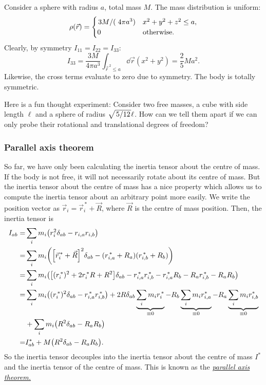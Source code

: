 \documentclass{article}
\begin{document}
\begin{example}[Sphere]
	Consider a sphere with radius $ a $, total mass $ M $. The mass distribution is uniform:
	\[
		\rho(\vec{r}) = \begin{cases}
		\flatfrac{3M}(4 \pi a^{3}) & x^{2} + y^{2} + z^{2} \leq a, \\ 0 & \text{otherwise.}
		\end{cases}
	\]
	Clearly, by symmetry $ I_{11} = I_{22} = I_{33} $: 
	\[
		I_{33} = \frac{3 M}{4 \pi a^{3}} \int_{\vec{r}^{\,2} \leq a} \dd{\vec{r}} (x^{2} + y^{2}) = \frac{2}{5} M a^{2}.
	\]
	Likewise, the cross terms evaluate to zero due to symmetry. The body is totally symmetric. 
	\par
	Here is a fun thought experiment: Consider two free masses, a cube with side length $ \ell $ and a sphere of radius $ \sqrt{\flatfrac{5}{12}} \ell$. How can we tell them apart if we can only probe their rotational and translational degrees of freedom?
\end{example}
\subsubsection{Parallel axis theorem}
So far, we have only been calculating the inertia tensor about the centre of mass. If the body is not free, it will not necessarily rotate about its centre of mass. But the inertia tensor about the centre of mass has a nice property which allows us to compute the inertia tensor about an arbitrary point more easily. We write the position vector as $\vec{r}_i = \vec{r}_i^{\,*} + \vec{R}$, where $\vec{R}$ is the centre of mass position. Then, the inertia tensor is
\begin{align}
    \begin{split}
        I_{ab} =& \sum_i m_i \qty(r_i^2 \delta_{ab} - r_{i,a} r_{i,b}) \\
        =& \sum_i m_i \qty(\qty[\vec{r}_i^{\,*} + \vec{R}]^2 \delta_{ab} - (r_{i,a}^{\,*} + R_a)({r}_{i,b}^{\,*} + R_b) ) \\
        =& \sum_i m_i \qty(\qty[(r^{\,*}_i)^2 + 2 r_i^{\,*}R + R^2]\delta_{ab} - {r}_{i,a}^{\,*}{r}_{i,b}^{\,*} - {r}_{i,a}^{\,*}R_b - R_a {r}_{i,b}^{\,*} - R_a R_b ) \\
        =&  \sum_i m_i \qty(({r}_{i}^{\,*})^2\delta_{ab} - {r}_{i,a}^{\,*}{r}_{i,b}^{\,*}) + 2R\delta_{ab} \underbrace{\sum_i m_i r_i^{\,*}}_{\equiv 0} - R_b \underbrace{\sum_i m_i r_{i,a}^*}_{\equiv 0} - R_a \underbrace{\sum_i m_i r_{i,b}^*}_{\equiv 0} \\&+ \sum_i m_i \qty(R^2 \delta_{ab} - R_a R_b) \\
        =& I^*_{ab} + M \qty(R^2 \delta_{ab} - R_a R_b).
    \end{split}
\end{align}
So the inertia tensor decouples into the inertia tensor about the centre of mass $I^*$ and the inertia tensor of the centre of mass. This is known as the \href{https://en.wikipedia.org/wiki/Parallel_axis_theorem}{\textit{parallel axis theorem.}}
\end{document}
